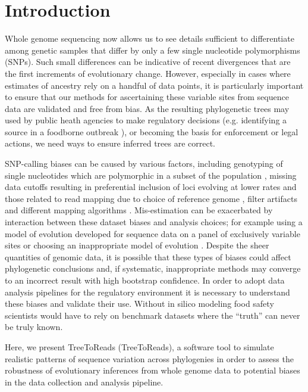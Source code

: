 \section*{Introduction}
Whole genome sequencing now allows us to see details sufficient to differentiate among genetic samples that differ by only a few single nucleotide polymorphisms (SNPs).
Such small differences can be indicative of recent divergences that are the first increments of evolutionary change.
However, especially in cases where estimates of ancestry rely on a handful of data points, 
it is particularly important to ensure that our methods for ascertaining these variable sites from sequence data are validated and free from bias.
As the resulting phylogenetic trees may used by public heath agencies to make regulatory decisions (e.g. identifying a source in a foodborne outbreak \citep{hoffmann_tracing_2015}),
or becoming the basis for enforcement or legal actions, we need ways to ensure inferred trees are correct. 

SNP-calling biases can be caused by various factors, 
including genotyping of single nucleotides which are polymorphic in a subset of the population \citep{mctavish_how_2015}, 
missing data cutoffs resulting in preferential inclusion of loci evolving at lower rates \citep{huang_unforeseen_2014} and those related to read mapping due to choice of reference genome \citep{bertels_automated_2014},
filter artifacts \citep{li_toward_2014} and different mapping algorithms \citep{pightling_choice_2014}. 
Mis-estimation can be exacerbated by interaction between these dataset biases and analysis choices; 
for example using a model of evolution developed for sequence data on a panel of exclusively variable sites \citep{lewis_likelihood_2001} 
or choosing an inappropriate model of evolution \citep{sullivan_are_1997}. Despite the sheer quantities of genomic data, 
it is possible that these types of biases could affect phylogenetic conclusions and, if systematic, inappropriate methods may converge to an incorrect result with high bootstrap confidence. 
In order to adopt data analysis pipelines for the regulatory environment it is necessary to understand these biases and validate their use. 
Without in silico modeling food safety scientists would have to rely on benchmark datasets where the “truth” can never be truly known.


Here, we present TreeToReads (TreeToReads), a software tool to simulate realistic patterns of sequence variation across phylogenies 
in order to assess the robustness of evolutionary inferences from whole genome data to potential biases in the data collection and analysis pipeline. 

